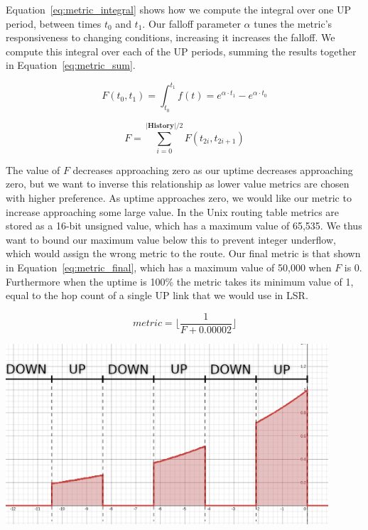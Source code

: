 \documentclass[withindex,glossary,openany]{cam-thesis}
\begin{document}
Equation~\ref{eq:metric_integral} shows how we compute the integral over one UP period, between times $t_0$ and $t_1$. Our falloff parameter $\alpha$ tunes the metric's responsiveness to changing conditions, increasing it increases the falloff. We compute this integral over each of the UP periods, summing the results together in Equation~\ref{eq:metric_sum}.

\begin{equation} \label{eq:metric_integral}
F(t_0, t_1) = \int_{t_0}^{t_1} f(t) = e^{\alpha \cdot t_1} - e^{\alpha \cdot t_0}
\end{equation}

\begin{equation} \label{eq:metric_sum}
F = \sum_{i = 0}^{|\textbf{History}|/2} F(t_{2i}, t_{2i+1})
\end{equation}

The value of $F$ decreases approaching zero as our uptime decreases approaching zero, but we want to inverse this relationship as lower value metrics are chosen with higher preference. As uptime approaches zero, we would like our metric to increase approaching some large value. In the Unix routing table metrics are stored as a 16-bit unsigned value, which has a maximum value of 65,535. We thus want to bound our maximum value below this to prevent integer underflow, which would assign the wrong metric to the route. Our final metric is that shown in Equation~\ref{eq:metric_final}, which has a maximum value of 50,000 when $F$ is 0. Furthermore when the uptime is 100\% the metric takes its minimum value of 1, equal to the hop count of a single UP link that we would use in LSR.

\begin{equation} \label{eq:metric_final}
\textit{metric} = \Big\lfloor\frac{1}{F+0.00002}\Big\rfloor
\end{equation}

\begin{center}
\begin{minipage}{0.9\textwidth} \centering
	\includegraphics[width=0.9\textwidth]{metric}
	\label{fig:metric}
\end{minipage}
\end{center}
\end{document}
